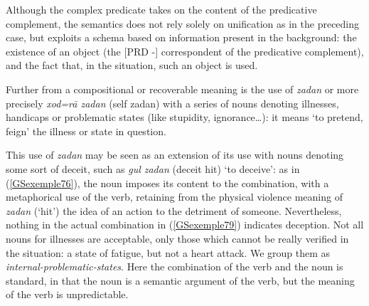\documentclass[output=paper
                ,modfonts
                ,nonflat
	        ,collection
	        ,collectionchapter
	        ,collectiontoclongg
 	        ,biblatex
                ,babelshorthands
                ,newtxmath
                ,draftmode
                ,colorlinks, citecolor=brown
]{./langsci/langscibook}
\begin{document}
{Although the complex predicate takes on the content of the predicative complement, the semantics does not rely solely on unification as in the preceding case, but exploits a schema based on information present in the background: the existence of an object (the [PRD -] correspondent of the predicative complement), and the fact that, in the situation, such an object is used.  

Further from a compositional or recoverable meaning is the use of \emph{zadan} or more precisely \emph{xod=r\=a zadan} (self zadan) with a series of nouns denoting illnesses, handicaps or problematic states (like stupidity, ignorance…): it means `to pretend, feign' the illness or state in question.

\z

This use of \emph{zadan} may be seen as an extension of its use with nouns denoting some sort of deceit, such as \emph{gul zadan} (deceit hit) `to deceive’: as in (\ref{GSexemple76}), the noun imposes its content to the combination, with a metaphorical use of the verb, retaining from the physical violence meaning of \emph{zadan} (`hit’) the idea of an action to the detriment of someone. Nevertheless, nothing in the actual combination in (\ref{GSexemple79}) indicates deception. Not all nouns for illnesses are acceptable, only those which cannot be really verified in the situation: a state of fatigue, but not a heart attack. We group them as \emph{internal-problematic-states}. Here the combination of the verb and the noun is standard, in that the noun is a semantic argument of the verb, but the meaning of the verb is unpredictable.

\begin{exe}
\end{exe}

}
\end{document}
